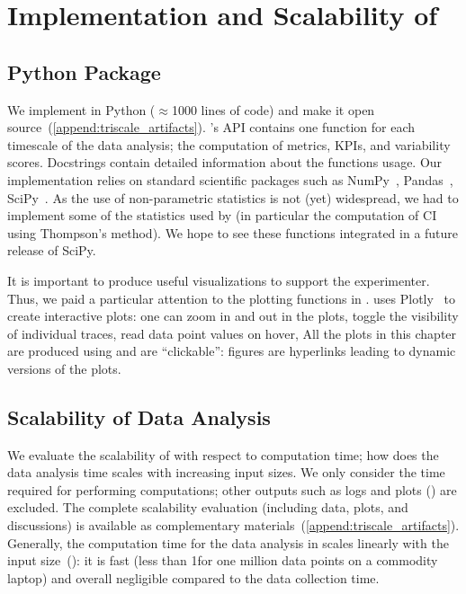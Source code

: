 
\section{Implementation and Scalability of \triscale}
\label{sec:triscale_implementation}

\subsection{Python Package}

We implement \triscale in Python ($\approx$1000 lines of code) and make it open source~(\cref{append:triscale_artifacts}).
\triscale's API contains one function for each timescale of the data analysis; \ie the computation of metrics, KPIs, and variability scores.
Docstrings contain detailed information about the functions usage.
Our implementation relies on standard scientific packages such as NumPy~\cite{numpy}, Pandas~\cite{pandas}, SciPy~\cite{scipy}.
As the use of non-parametric statistics is not (yet) widespread, we had to implement some of the statistics used by \triscale (in particular the computation of CI using Thompson's method).
We hope to see these functions integrated in a future release of SciPy.

It is important to produce useful visualizations to support the experimenter.
Thus, we paid a particular attention to the plotting functions in \triscale.
\triscale uses Plotly~\cite{plotly} to create interactive plots: one can zoom in and out in the plots, toggle the visibility of individual traces, read data point values on hover, \etc
All the plots in this chapter are produced using \triscale and are ``clickable'': figures are hyperlinks leading to dynamic versions of the plots.


\subsection{Scalability of \triscale Data Analysis}
\label{subsec:scalability}

We evaluate the scalability of \triscale with respect to computation time; \ie how does the data analysis time scales with increasing input sizes.
We only consider the time required for performing computations; other outputs such as logs and plots (\eg {}) are excluded.
The complete scalability evaluation (including data, plots, and discussions) is available as complementary materials~(\cref{append:triscale_artifacts}).
Generally, the computation time for the data analysis in \triscale scales linearly with the input size~(): it is fast (less than 1\s for one million data points on a commodity laptop) and overall negligible compared to the data collection time.


